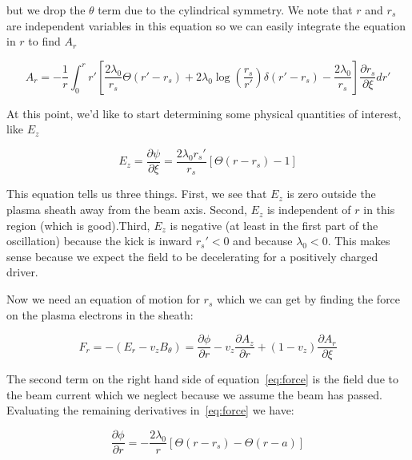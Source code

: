 \documentclass[aps,prl,preprint,groupedaddress]{revtex4-1}
\begin{document}
but we drop the $\theta$ term due to the cylindrical symmetry. We note that $r$ and $r_s$ are independent variables in this equation so we can easily integrate the equation in $r$ to find $A_r$

\begin{equation}\label{eq:a_r}
A_r = -\frac{1}{r}\int_0^rr'\left[\frac{2\lambda_0}{r_s}\Theta(r'-r_s) + 2\lambda_0 \log\left(\frac{r_s}{r'}\right)\delta(r'-r_s) - \frac{2\lambda_0}{r_s}\right]\frac{\partial r_s}{\partial \xi}dr'
\end{equation}



At this point, we'd like to start determining some physical quantities of interest, like $E_z$

\begin{equation}\label{eq:E_z}
E_z = \frac{\partial \psi}{\partial \xi} = \frac{2\lambda_0 r_s'}{r_s}\left[\Theta(r-r_s)-1\right] 
\end{equation}

This equation tells us three things. First, we see that $E_z$ is zero outside the plasma sheath away from the beam axis. Second, $E_z$ is independent of $r$ in this region (which is good).Third, $E_z$ is negative (at least in the first part of the oscillation) because the kick is inward $r_s' < 0$ and because $\lambda_0 < 0$. This makes sense because we expect the field to be decelerating for a positively charged driver. 

Now we need an equation of motion for $r_s$ which we can get by finding the force on the plasma electrons in the sheath:

\begin{equation}\label{eq:force}
F_r =-(E_r -v_z B_{\theta}) = \frac{\partial \phi}{\partial r} - v_z\frac{\partial A_z}{\partial r} + (1-v_z)\frac{\partial A_r}{\partial \xi}
\end{equation}

The second term on the right hand side of equation~\ref{eq:force} is the field due to the beam current which we neglect because we assume the beam has passed. Evaluating the remaining derivatives in~\ref{eq:force} we have:

\begin{equation}\label{dphi}
\frac{\partial \phi}{\partial r} = -\frac{2\lambda_0}{r}\left[\Theta(r-r_s)-\Theta(r-a)\right]
\end{equation}
\end{document}

